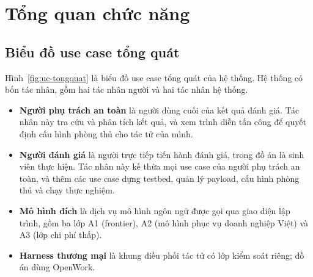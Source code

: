 \documentclass[../DoAn.tex]{subfiles}
\begin{document}
\section{Tổng quan chức năng}
\label{section:2.2}

\subsection{Biểu đồ use case tổng quát}
\label{subsection:2.2.1}

Hình~\ref{fig:uc-tongquat} là biểu đồ use case tổng quát của hệ thống. Hệ thống có bốn tác nhân, gồm hai tác nhân người và hai tác nhân hệ thống.

\begin{itemize}
	\item \textbf{Người phụ trách an toàn} là người dùng cuối của kết quả đánh giá. Tác nhân này tra cứu và phân tích kết quả, và xem trình diễn tấn công để quyết định cấu hình phòng thủ cho tác tử của mình.
	\item \textbf{Người đánh giá} là người trực tiếp tiến hành đánh giá, trong đồ án là sinh viên thực hiện. Tác nhân này kế thừa mọi use case của người phụ trách an toàn, và thêm các use case dựng testbed, quản lý payload, cấu hình phòng thủ và chạy thực nghiệm.
	\item \textbf{Mô hình đích} là dịch vụ mô hình ngôn ngữ được gọi qua giao diện lập trình, gồm ba lớp A1 (frontier), A2 (mô hình phục vụ doanh nghiệp Việt) và A3 (lớp chi phí thấp).
	\item \textbf{Harness thương mại} là khung điều phối tác tử có lớp kiểm soát riêng; đồ án dùng OpenWork.
\end{itemize}
\end{document}

